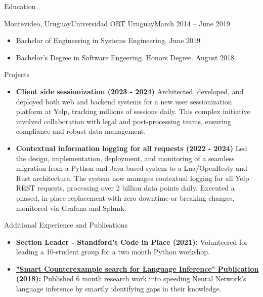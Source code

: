 \documentclass[]{mcdowellcv}
\begin{document}
	\begin{cvsection}{Education}
		\begin{cvsubsection}{Montevideo, Uruguay}{Universidad ORT Uruguay}{March 2014 -- June 2019}
			\begin{itemize}
				\item Bachelor of Engineering in Systems Engineering. June 2019
				\item Bachelor's Degree in Software Engeering. Honors Degree. August 2018
			\end{itemize}
		\end{cvsubsection}
	\end{cvsection}
	\begin{cvsection}{Projects}
		\begin{cvsubsection}{}{}{}
			\begin{itemize}
				\item \textbf{Client side sessionization (2023 - 2024)} Architected, developed, and deployed both web and backend systems for a new user sessionization platform at Yelp, tracking millions of sessions daily. This complex initiative involved collaboration with legal and post-processing teams, ensuring compliance and robust data management.
				\item \textbf{Contextual information logging for all requests (2022 - 2024)} Led the design, implementation, deployment, and monitoring of a seamless migration from a Python and Java-based system to a Lua/OpenResty and Rust architecture. The system now manages contextual logging for all Yelp REST requests, processing over 2 billion data points daily. Executed a phased, in-place replacement with zero downtime or breaking changes, monitored via Grafana and Splunk.
			\end{itemize}
		\end{cvsubsection}
	\end{cvsection}
	
	\begin{cvsection}{Additional Experience and Publications}
		\begin{cvsubsection}{}{}{}	
			\begin{itemize}
				\item \textbf{Section Leader - Standford's Code in Place (2021):} Volunteered for leading a 10-student group for a two month Python workshop.
				\item \textbf{\href{https://sisbibliotecas.ort.edu.uy/file/5435}{"Smart Counterexample search for Language Inference" Publication} (2018):} Published 6 month research work into speeding Neural Network's language inference by smartly identifying gaps in their knowledge.
			\end{itemize}
		\end{cvsubsection}
	\end{cvsection}
	
\end{document}
